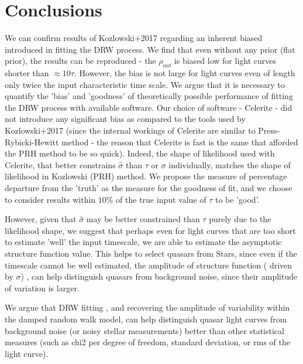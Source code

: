 \documentclass[fleqn,usenatbib]{mnras}  %
\begin{document}
\section{Conclusions}

We can confirm results of Kozlowski+2017 regarding an inherent biased introduced in fitting the DRW process. We find that even without any prior (flat prior), the results can be reproduced - the $\rho_{out}$ is biased low for light curves shorter than $\approx 10 \tau$.  However,  the bias is not large for light curves even of length only twice the input characteristic time scale. We argue that it is necessary to quantify the 'bias' and 'goodness' of  theoretically possible performance of  fitting the DRW process with available software. Our choice of software - Celerite - did not introduce any significant bias as compared to the tools used by Kozlowski+2017 (since the internal workings of Celerite are similar to Press-Rybicki-Hewitt method - the reason that Celerite is fast is the same that afforded the PRH method to be so quick). Indeed, the shape of likelihood used with Celerite, that better constrains $\hat{\sigma}$ than $\tau$ or $\sigma$  individually, matches the shape of likelihood in Kozlowski (PRH) method.  We propose the measure of percentage departure from the 'truth' as the measure for the goodness of fit,  and we choose  to consider results within $10 \%$ of the true input value of $\tau$ to be 'good'. 

However,  given that $\hat{\sigma}$ may be better constrained than $\tau$ purely due to the likelihood shape,  we suggest that perhaps even for light curves that are too short to estimate 'well' the input timescale, we are able to estimate the asymptotic structure function value. This helps to select quasars from Stars, since even if the timescale cannot be well estimated,  the amplitude of structure function ( driven by $\sigma$) ,  can help distinguish quasars from background noise, since their amplitude of variation is larger. 

We argue that DRW fitting , and recovering the amplitude of variability within the damped random walk model, can help distinguish  quasar light curves from background noise (or noisy stellar measurements) better than other statistical measures (such as chi2 per degree of freedom, standard deviation,  or rms of the light curve).  
\end{document}
